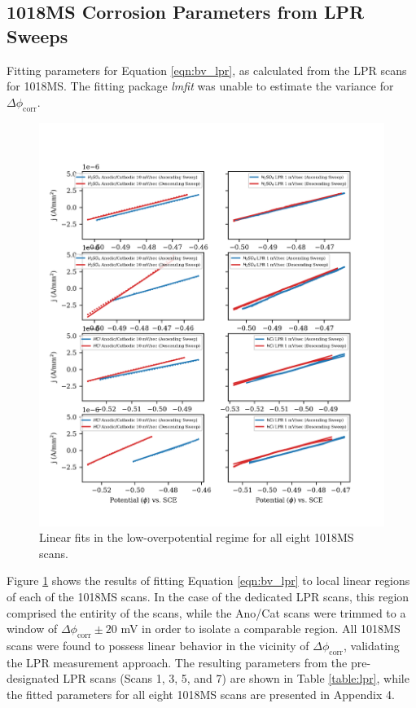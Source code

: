 \subsection{1018MS Corrosion Parameters from LPR Sweeps}

	\begin{table}[h!]
		\centering
		
		\caption{Fitting parameters for Equation \ref{eqn:bv_lpr}, as calculated from the LPR scans for 1018MS.  The fitting package \textit{lmfit} was unable to estimate the variance for $\Delta \phi_{\text{corr}}$.}
		\label{table:lpr}
	\end{table}

	\begin{figure}[h!]
		\centering
		\includegraphics[width=5.0in]{resources/fig_2c.png}
		\caption{Linear fits in the low-overpotential regime for all eight 1018MS scans.}
		\label{fig:lpr}
	\end{figure}

Figure \ref{fig:lpr} shows the results of fitting Equation \ref{eqn:bv_lpr} to local linear regions of each of the 1018MS scans.  In the case of the dedicated LPR scans, this region comprised the entirity of the scans, while the Ano/Cat scans were trimmed to a window of $\Delta \phi_{\text{corr}} \pm 20$ mV in order to isolate a comparable region.  All 1018MS scans were found to possess linear behavior in the vicinity of $\Delta \phi_{\text{corr}}$, validating the LPR measurement approach.  The resulting parameters from the pre-designated LPR scans (Scans 1, 3, 5, and 7) are shown in Table \ref{table:lpr}, while the fitted parameters for all eight 1018MS scans are presented in Appendix 4.

